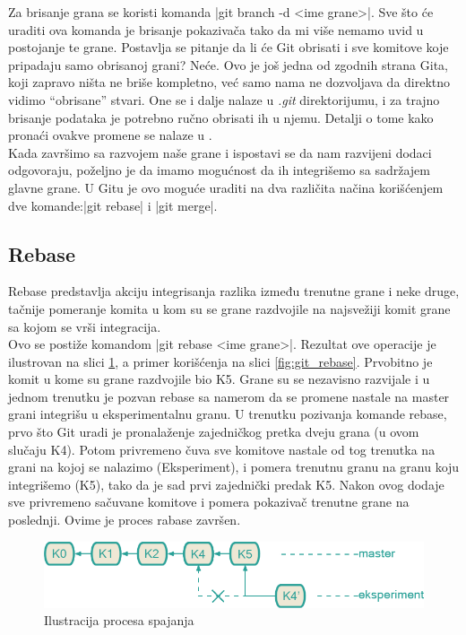 \documentclass[a4paper]{article}
\begin{document}
{Za brisanje grana se koristi komanda |git branch -d <ime grane>|. Sve što će uraditi ova komanda je brisanje pokazivača tako da mi više nemamo uvid u postojanje te grane. Postavlja se pitanje da li će Git obrisati i sve komitove koje pripadaju samo obrisanoj grani? Neće. Ovo je još jedna od zgodnih strana Gita, koji zapravo ništa ne briše kompletno, već samo nama ne dozvoljava da direktno vidimo ``obrisane'' stvari. One se i dalje nalaze u \textit{.git} direktorijumu, i za trajno brisanje podataka je potrebno ručno obrisati ih u njemu. Detalji o tome kako pronaći ovakve promene se nalaze u \cite{progit}.\\

Kada završimo sa razvojem naše grane i ispostavi se da nam razvijeni dodaci odgovoraju, poželjno je da imamo mogućnost da ih integrišemo sa sadržajem glavne grane. U Gitu je ovo moguće uraditi na dva različita načina korišćenjem dve komande:|git rebase| i |git merge|.  

\subsection{Rebase}
\label{subsec:rebase}
Rebase predstavlja akciju integrisanja razlika između trenutne grane i neke druge, tačnije pomeranje komita u kom su se grane razdvojile na najsvežiji komit grane sa kojom se vrši integracija.\\

Ovo se postiže komandom |git rebase <ime grane>|. Rezultat ove operacije je ilustrovan na slici \ref{fig:rebase}, a primer korišćenja na slici \ref{fig:git_rebase}. Prvobitno je komit u kome su grane razdvojile bio K5. Grane su se nezavisno razvijale i u jednom trenutku je pozvan rebase sa namerom da se promene nastale na master grani integrišu u eksperimentalnu granu. U trenutku pozivanja komande rebase, prvo što Git uradi je pronalaženje zajedničkog pretka dveju grana (u ovom slučaju K4). Potom privremeno čuva sve komitove nastale od tog trenutka na grani na kojoj se nalazimo (Eksperiment), i pomera trenutnu granu na granu koju integrišemo (K5), tako da je sad prvi zajednički predak K5. Nakon ovog dodaje sve privremeno sačuvane komitove i pomera pokazivač trenutne grane na poslednji. Ovime je proces rabase završen.
\begin{figure}[h!]
\begin{center}
\includegraphics[scale=0.3]{images/rebase.png}
\end{center}
\caption{Ilustracija procesa spajanja}
\label{fig:rebase}
\end{figure}

}
\end{document}

